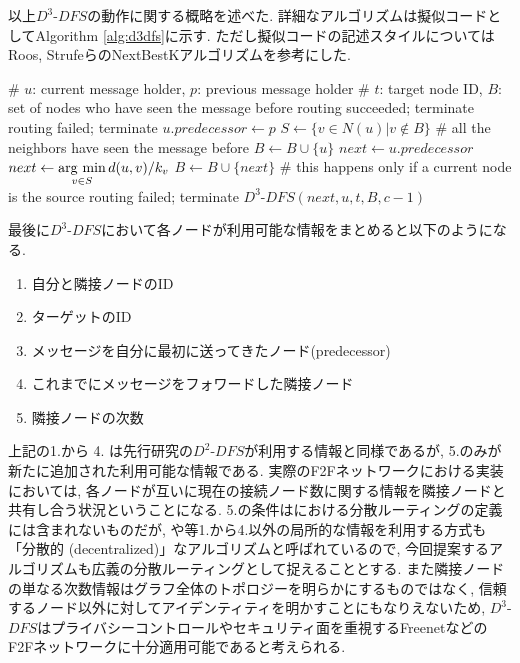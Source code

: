 \documentclass[dvipdfmx]{ampbt}
\newcommand{\argmin}{\mathop{\rm arg~min}\limits}
\begin{document}
以上$D^3$-$DFS$の動作に関する概略を述べた. 詳細なアルゴリズムは擬似コードとしてAlgorithm \ref{alg:d3dfs}に示す. ただし擬似コードの記述スタイルについてはRoos, StrufeらのNextBestKアルゴリズム\cite{roos2012provable}を参考にした.
   \begin{algorithm}[htbp]
    \caption{$D^3$-$DFS(\textrm{Node } u,\textrm{ Node } p, \textrm{ ID } t,\textrm{ Set }B, \textrm{ TTL }c$)}\label{alg:d3dfs}
    \begin{algorithmic}[1]
     \State \# $u$: current message holder, $p$: previous message holder
     \State \# $t$: target node ID, $B$: set of nodes who have seen the message before
     \State \textrm{routing succeeded; terminate}
     \EndIf
     \State \textrm{routing failed; terminate}
     \EndIf
     \State $u.predecessor \gets p$
     \EndIf
     \State $S \gets \{v \in N(u) |  v \notin B \}$
      \# all the neighbors have seen the message before
     \State $B \gets B \cup \{u\}$
     \State $next \gets u.predecessor$
     \Else
     \State $next \gets \argmin_{v \in S} d(u, v)/k_v$
     \State $B \gets B \cup \{ next\}$
     \EndIf
      \# this happens only if a current node is the source
     \State \textrm{routing failed; terminate}
     \Else
     \State $D^3$-$DFS(next, u, t, B, c-1)$
     \EndIf
    \end{algorithmic}
   \end{algorithm}

最後に$D^3$-$DFS$において各ノードが利用可能な情報をまとめると以下のようになる.
\begin{enumerate}
 \item 自分と隣接ノードのID
 \item ターゲットのID
 \item メッセージを自分に最初に送ってきたノード(predecessor)
 \item これまでにメッセージをフォワードした隣接ノード
 \item 隣接ノードの次数
\end{enumerate}

上記の1.から 4. は先行研究の$D^2$-$DFS$が利用する情報と同様であるが, 5.のみが新たに追加された利用可能な情報である. 実際のF2Fネットワークにおける実装においては, 各ノードが互いに現在の接続ノード数に関する情報を隣接ノードと共有し合う状況ということになる. 5.の条件は\cite{kleinberg2000small}における分散ルーティングの定義には含まれないものだが, \cite{manku2004know}や\cite{lebhar2004almost}等1.から4.以外の局所的な情報を利用する方式も「分散的 (decentralized)」なアルゴリズムと呼ばれているので, 今回提案するアルゴリズムも広義の分散ルーティングとして捉えることとする. また隣接ノードの単なる次数情報はグラフ全体のトポロジーを明らかにするものではなく, 信頼するノード以外に対してアイデンティティを明かすことにもなりえないため, $D^3$-$DFS$はプライバシーコントロールやセキュリティ面を重視するFreenetなどのF2Fネットワークに十分適用可能であると考えられる. \newline
\end{document}
